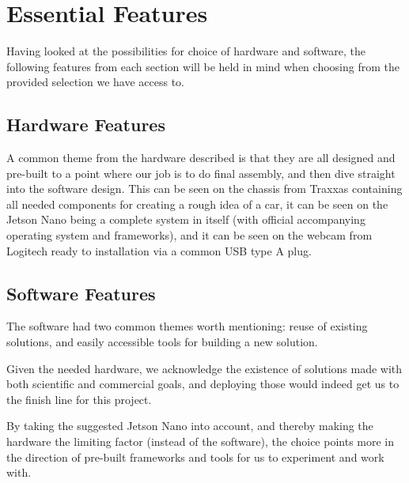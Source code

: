 \section{Essential Features}\label{sec:essentialFeatures}
Having looked at the possibilities for choice of hardware and software, the following features from each section will be held in mind when choosing from the provided selection we have access to.

\subsection{Hardware Features}\label{ssec:essentialFeaturesHardware}
A common theme from the hardware described is that they are all designed and pre-built to a point where our job is to do final assembly, and then dive straight into the software design.
This can be seen on the chassis from Traxxas containing all needed components for creating a rough idea of a car, it can be seen on the Jetson Nano being a complete system in itself (with official accompanying operating system and frameworks), and it can be seen on the webcam from Logitech ready to installation via a common USB type A plug.

\subsection{Software Features}\label{ssec:essentialFeaturesSoftware}
The software had two common themes worth mentioning: reuse of existing solutions, and easily accessible tools for building a new solution.

Given the needed hardware, we acknowledge the existence of solutions made with both scientific and commercial goals, and deploying those would indeed get us to the finish line for this project.

By taking the suggested Jetson Nano into account, and thereby making the hardware the limiting factor (instead of the software), the choice points more in the direction of pre-built frameworks and tools for us to experiment and work with.
